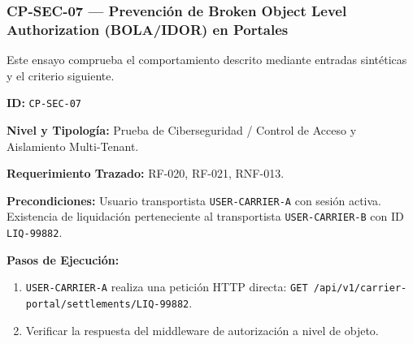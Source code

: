 \subsubsection*{CP-SEC-07 — Prevención de Broken Object Level Authorization (BOLA/IDOR) en Portales}\label{sec:9-cp-sec-07}
Este ensayo comprueba el comportamiento descrito mediante entradas sintéticas y el criterio siguiente.

\par\noindent\textbf{ID:} \texttt{C\allowbreak{}P\allowbreak{}-\allowbreak{}S\allowbreak{}E\allowbreak{}C\allowbreak{}-\allowbreak{}0\allowbreak{}7\allowbreak{}}\par
\par\noindent\textbf{Nivel y Tipología:} Prueba de Ciberseguridad / Control de Acceso y Aislamiento Multi-Tenant.\par
\par\noindent\textbf{Requerimiento Trazado:} RF-020, RF-021, RNF-013.\par
\par\noindent\textbf{Precondiciones:} Usuario transportista \texttt{U\allowbreak{}S\allowbreak{}E\allowbreak{}R\allowbreak{}-\allowbreak{}C\allowbreak{}A\allowbreak{}R\allowbreak{}R\allowbreak{}I\allowbreak{}E\allowbreak{}R\allowbreak{}-\allowbreak{}A\allowbreak{}} con sesión activa. Existencia de liquidación perteneciente al transportista \texttt{U\allowbreak{}S\allowbreak{}E\allowbreak{}R\allowbreak{}-\allowbreak{}C\allowbreak{}A\allowbreak{}R\allowbreak{}R\allowbreak{}I\allowbreak{}E\allowbreak{}R\allowbreak{}-\allowbreak{}B\allowbreak{}} con ID \texttt{L\allowbreak{}I\allowbreak{}Q\allowbreak{}-\allowbreak{}9\allowbreak{}9\allowbreak{}8\allowbreak{}8\allowbreak{}2\allowbreak{}}.\par
\par\noindent\textbf{Pasos de Ejecución:} \par
\begin{enumerate}
\item \texttt{U\allowbreak{}S\allowbreak{}E\allowbreak{}R\allowbreak{}-\allowbreak{}C\allowbreak{}A\allowbreak{}R\allowbreak{}R\allowbreak{}I\allowbreak{}E\allowbreak{}R\allowbreak{}-\allowbreak{}A\allowbreak{}} realiza una petición HTTP directa: \texttt{G\allowbreak{}E\allowbreak{}T\allowbreak{} /\allowbreak{}a\allowbreak{}p\allowbreak{}i\allowbreak{}/\allowbreak{}v\allowbreak{}1\allowbreak{}/\allowbreak{}c\allowbreak{}a\allowbreak{}r\allowbreak{}r\allowbreak{}i\allowbreak{}e\allowbreak{}r\allowbreak{}-\allowbreak{}p\allowbreak{}o\allowbreak{}r\allowbreak{}t\allowbreak{}a\allowbreak{}l\allowbreak{}/\allowbreak{}s\allowbreak{}e\allowbreak{}t\allowbreak{}t\allowbreak{}l\allowbreak{}e\allowbreak{}m\allowbreak{}e\allowbreak{}n\allowbreak{}t\allowbreak{}s\allowbreak{}/\allowbreak{}L\allowbreak{}I\allowbreak{}Q\allowbreak{}-\allowbreak{}9\allowbreak{}9\allowbreak{}8\allowbreak{}8\allowbreak{}2\allowbreak{}}.
\item Verificar la respuesta del middleware de autorización a nivel de objeto.
\end{enumerate}
